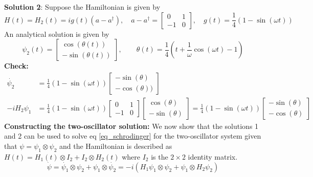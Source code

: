 \documentclass[11pt]{article}
\begin{document}
\textbf{Solution 2}: Suppose the Hamiltonian is given by
\begin{equation}
    H(t)=H_2(t) = ig(t)(a-a^\dag), \quad a-a^\dag =
    \begin{bmatrix}
        0 & 1\\
        -1 & 0
    \end{bmatrix}, \quad g(t) = \frac{1}{4}(1-\sin(\omega t))
\end{equation}
An analytical solution is given by
\begin{equation}
    \psi_2(t) = \begin{bmatrix}
                    \cos(\theta(t))\\
                    -\sin(\theta(t))
                \end{bmatrix}, \quad \quad \theta(t) = \frac{1}{4}(t+\frac{1}{\omega}\cos(\omega t)-1)
\end{equation}
\textbf{Check:}
\begin{align}
    \dot{\psi_2} &= \frac{1}{4}(1-\sin(\omega t)) \begin{bmatrix} -\sin(\theta)\\
                                    -\cos(\theta)) \end{bmatrix}\\
    -iH_2\psi_1 &= \frac{1}{4}(1-\sin(\omega t))\begin{bmatrix} 0 & 1\\ -1 & 0 \end{bmatrix}
                                            \begin{bmatrix} \cos(\theta) \\ -\sin(\theta) \end{bmatrix} =
                                            \frac{1}{4}(1-\sin(\omega t)) \begin{bmatrix} -\sin(\theta)\\
                                            -\cos(\theta) \end{bmatrix}
\end{align}
\textbf{Constructing the two-oscillator solution:}
We now show that the solutions 1 and 2 can be used to solve eq \eqref{eq_schrodinger} for the two-oscillator system given that $\psi = \psi_1 \otimes \psi_2$ and the Hamiltonian is described as $H(t) = H_1(t)\otimes I_2 + I_2 \otimes H_2(t)$ where $I_2$ is the $2\times2$ identity matrix.
\begin{equation}\label{psidot}
    \dot{\psi} = \dot{\psi_1}\otimes \psi_2 + \psi_1 \otimes \dot{\psi_2} = -i(H_1\psi_1\otimes \psi_2
                    + \psi_1\otimes H_2\psi_2)
\end{equation}
\end{document}

